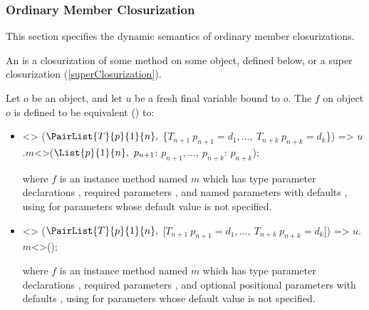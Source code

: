 \documentclass[makeidx]{article}
\begin{document}
{\subsubsection{Ordinary Member Closurization}

\LMHash{}%
This section specifies the dynamic semantics of
ordinary member closurizations.


\LMHash{}%
An 
is a closurization of some method on some object, defined below,
or a super closurization (\ref{superClosurization}).

\LMHash{}%
Let $o$ be an object, and let $u$ be a fresh final variable bound to $o$.
The  $f$ on object $o$
is defined to be equivalent
() to:
\begin{itemize}
\item
\begin{normativeDartCode}
<>
($\PairList{T}{p}{1}{n},\ $\{$T_{n+1}\ p_{n+1} = d_1, \ldots,\ T_{n+k}\ p_{n+k} = d_k$\}) =>
\quad$u$.$m$<>($\List{p}{1}{n},\ p_{n+1}$: $p_{n+1}, \ldots,\ p_{n+k}$: $p_{n+k}$);
\end{normativeDartCode}
where $f$ is an instance method named $m$
which has type parameter declarations
\TypeParametersStd{},
required parameters ,
and named parameters  with defaults ,
using  for parameters whose default value is not specified.
\item
\begin{normativeDartCode}
<>
($\PairList{T}{p}{1}{n},\ $[$T_{n+1}\ p_{n+1} = d_1, \ldots,\ T_{n+k}\ p_{n+k} = d_k$]) =>
\quad$u$.$m$<>();
\end{normativeDartCode}
where $f$ is an instance method named $m$
which has type parameter declarations
\TypeParametersStd{},
required parameters ,
and optional positional parameters
 with defaults ,
using  for parameters whose default value is not specified.
\end{itemize}

}
\end{document}
